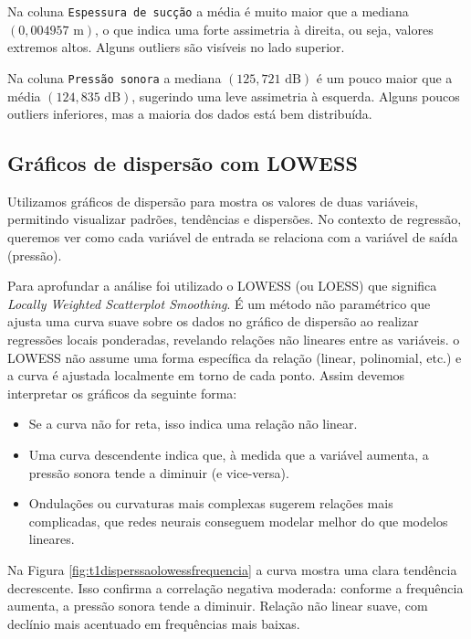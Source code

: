 \documentclass[12pt,a4paper,oneside]{report}
\newcommand{\fig}[1]{Figura \ref{#1}}
\begin{document}
Na coluna \texttt{Espessura de sucção} a média é muito maior que a mediana $(0,004957\text{ m})$, o que indica uma forte assimetria à direita, ou seja, valores extremos altos. Alguns outliers são visíveis no lado superior.

Na coluna \texttt{Pressão sonora} a mediana $(125,721\text{ dB})$ é um pouco maior que a média $(124,835\text{ dB})$, sugerindo uma leve assimetria à esquerda. Alguns poucos outliers inferiores, mas a maioria dos dados está bem distribuída.
	
	
\subsection{Gráficos de dispersão com LOWESS}

Utilizamos gráficos de dispersão para mostra os valores de duas variáveis, permitindo visualizar padrões, tendências e dispersões. No contexto de regressão, queremos ver como cada variável de entrada se relaciona com a variável de saída (pressão).

Para aprofundar a análise foi utilizado o LOWESS (ou LOESS) que significa \textit{Locally Weighted Scatterplot Smoothing}. É um método não paramétrico que ajusta uma curva suave sobre os dados no gráfico de dispersão ao realizar regressões locais ponderadas, revelando relações não lineares entre as variáveis. o LOWESS não assume uma forma específica da relação (linear, polinomial, etc.) e a curva é ajustada localmente em torno de cada ponto. Assim devemos interpretar os gráficos da seguinte forma:
\begin{itemize}
	\item Se a curva não for reta, isso indica uma relação não linear.
	\item Uma curva descendente indica que, à medida que a variável aumenta, a pressão sonora tende a diminuir (e vice-versa).
	\item Ondulações ou curvaturas mais complexas sugerem relações mais complicadas, que redes neurais conseguem modelar melhor do que modelos lineares.
\end{itemize}
Na \fig{fig:t1disperssaolowessfrequencia} a curva mostra uma clara tendência decrescente. Isso confirma a correlação negativa moderada: conforme a frequência aumenta, a pressão sonora tende a diminuir. Relação não linear suave, com declínio mais acentuado em frequências mais baixas.
\end{document}
